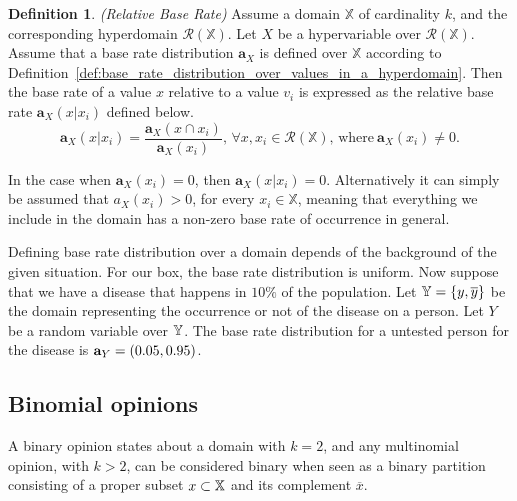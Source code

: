 \documentclass[a4paper,12pt]{article}
\theoremstyle{definition}
\newtheorem{definition}{Definition}[section]
\numberwithin{equation}{section}
\begin{document}
\begin{definition}
	\emph{(Relative Base Rate)} Assume a domain $\mathbb{X}$ of cardinality $k$, and the corresponding hyperdomain $\mathcal{R}(\mathbb{X})$. Let $X$ be a hypervariable over $\mathcal{R}(\mathbb{X})$. Assume that a base rate distribution $\mathbf{a}_X$ is defined over $\mathbb{X}$ according to Definition~\ref{def:base_rate_distribution_over_values_in_a_hyperdomain}. Then the base rate of a value $x$ relative to a value $v_i$ is expressed as the relative base rate $\mathbf{a}_X(x|x_i)$ defined below.
	\begin{equation}
		\mathbf{a}_X(x|x_i) = \dfrac{\mathbf{a}_X(x \cap x_i)}{\mathbf{a}_X(x_i)}\text{, } \forall x, x_i \in \mathcal{R}(\mathbb{X}) \text{, where}\ \mathbf{a}_X(x_i) \neq 0\text{.}
	\end{equation}

	In the case when $\mathbf{a}_X(x_i) = 0$, then $\mathbf{a}_X(x|x_i) = 0$. Alternatively it can simply be assumed that $a_X(x_i) > 0$, for every $x_i \in \mathbb{X}$, meaning that everything we include in the domain has a non-zero base rate of occurrence in general.
\end{definition}

Defining base rate distribution over a domain depends of the background of the given situation. For our box, the base rate distribution is uniform. Now suppose that we have a disease that happens in $10\%$ of the population. Let $\mathbb{Y} = \{y, \overline{y}\}$ be the domain representing the occurrence or not of the disease on a person. Let $Y$ be a random variable over $\mathbb{Y}$. The base rate distribution for a untested person for the disease is $\mathbf{a}_{Y} = (0.05, 0.95)$.

\subsection{Binomial opinions}

A binary opinion states about a domain with $k = 2$, and any multinomial opinion, with $k > 2$, can be considered binary when seen as a binary partition consisting of a proper subset $x \subset \mathbb{X}$ and its complement $\overline{x}$.
\end{document}
